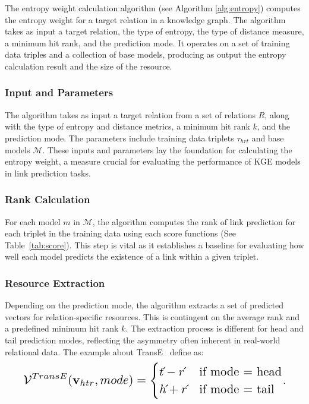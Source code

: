 \documentclass{article}
\begin{document}
\vspace{10pt}

The entropy weight calculation algorithm (see Algorithm \ref{alg:entropy}) computes the entropy weight for a target relation in a knowledge graph. The algorithm takes as input a target relation, the type of entropy, the type of distance measure, a minimum hit rank, and the prediction mode. It operates on a set of training data triples and a collection of base models, producing as output the entropy calculation result and the size of the resource.

\subsubsection{Input and Parameters}
The algorithm takes as input a target relation from a set of relations \( R \), along with the type of entropy and distance metrics, a minimum hit rank \( k \), and the prediction mode. The parameters include training data triplets \( \tau_{hrt} \) and base models \( \mathcal{M} \). These inputs and parameters lay the foundation for calculating the entropy weight, a measure crucial for evaluating the performance of KGE models in link prediction tasks.

\subsubsection{Rank Calculation}
For each model \( m \) in \( \mathcal{M} \), the algorithm computes the rank of link prediction for each triplet in the training data using each score functions (See Table~\ref{tab:score}). This step is vital as it establishes a baseline for evaluating how well each model predicts the existence of a link within a given triplet.

\subsubsection{Resource Extraction}
Depending on the prediction mode, the algorithm extracts a set of predicted vectors for relation-specific resources. This is contingent on the average rank and a predefined minimum hit rank \( k \). The extraction process is different for head and tail prediction modes, reflecting the asymmetry often inherent in real-world relational data. The example about TransE~\cite{bordes2013translating} define as:
\begin{equation}
    \resizebox{.91\linewidth}{!}{$
            \displaystyle
            \mathcal{V}^{TransE}(\mathbf{v}_{htr}, mode) = \begin{cases}
                    t\acute{}-r\acute{} & \text{if mode = head} \\
                    h\acute{}+r\acute{} & \text{if mode = tail} \\
                \end{cases}
        $}.
\end{equation}
\end{document}
